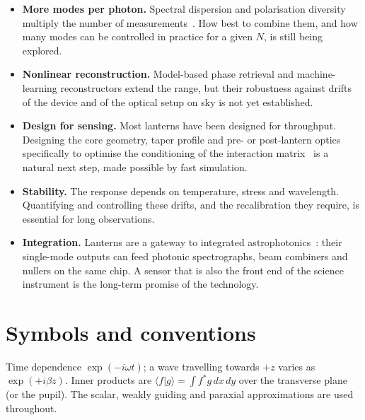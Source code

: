 \documentclass[11pt,a4paper]{article}
\newcommand{\braket}[2]{\langle #1|#2\rangle}
\begin{document}
\begin{itemize}
\item \textbf{More modes per photon.} Spectral dispersion and polarisation diversity multiply the number of measurements~\cite{Lin2023PRL,Lin2025}. How best to combine them, and how many modes can be controlled in practice for a given $N$, is still being explored.
\item \textbf{Nonlinear reconstruction.} Model-based phase retrieval and machine-learning reconstructors extend the range, but their robustness against drifts of the device and of the optical setup on sky is not yet established.
\item \textbf{Design for sensing.} Most lanterns have been designed for throughput. Designing the core geometry, taper profile and pre- or post-lantern optics specifically to optimise the conditioning of the interaction matrix~\cite{Lin2023} is a natural next step, made possible by fast simulation.
\item \textbf{Stability.} The response depends on temperature, stress and wavelength. Quantifying and controlling these drifts, and the recalibration they require, is essential for long observations.
\item \textbf{Integration.} Lanterns are a gateway to integrated astrophotonics~\cite{Jovanovic2023}: their single-mode outputs can feed photonic spectrographs, beam combiners and nullers on the same chip. A sensor that is also the front end of the science instrument is the long-term promise of the technology.
\end{itemize}

\appendix
\section{Symbols and conventions}
Time dependence $\exp(-i\omega t)$; a wave travelling towards $+z$ varies as $\exp(+i\beta z)$. Inner products are $\braket{f}{g} = \int f^* g\, dx\, dy$ over the transverse plane (or the pupil). The scalar, weakly guiding and paraxial approximations are used throughout.
\end{document}
